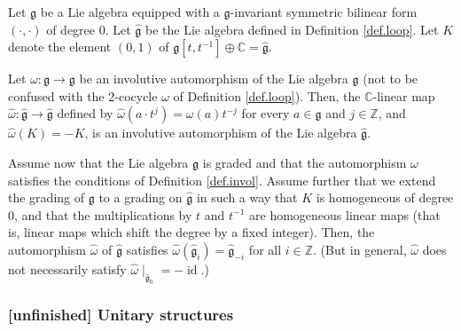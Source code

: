 \documentclass[etingof-lie.tex]{subfiles}
\begin{document}
\begin{proposition}
Let $\mathfrak{g}$ be a Lie algebra equipped with a $\mathfrak{g}$-invariant
symmetric bilinear form $\left(  \cdot,\cdot\right)  $ of degree $0$. Let
$\widehat{\mathfrak{g}}$ be the Lie algebra defined in Definition
\ref{def.loop}. Let $K$ denote the element $\left(  0,1\right)  $ of
$\mathfrak{g}\left[  t,t^{-1}\right]  \oplus\mathbb{C}=\widehat{\mathfrak{g}}$.

Let $\omega:\mathfrak{g}\rightarrow\mathfrak{g}$ be an involutive automorphism
of the Lie algebra $\mathfrak{g}$ (not to be confused with the $2$-cocycle
$\omega$ of Definition \ref{def.loop}). Then, the $\mathbb{C}$-linear map
$\widehat{\omega}:\widehat{\mathfrak{g}}\rightarrow\widehat{\mathfrak{g}}$
defined by $\widehat{\omega}\left(  a\cdot t^{j}\right)  =\omega\left(
a\right)  t^{-j}$ for every $a\in\mathfrak{g}$ and $j\in\mathbb{Z}$, and
$\widehat{\omega}\left(  K\right)  =-K$, is an involutive automorphism of the
Lie algebra $\widehat{\mathfrak{g}}$.

Assume now that the Lie algebra $\mathfrak{g}$ is graded and that the
automorphism $\omega$ satisfies the conditions of Definition \ref{def.invol}.
Assume further that we extend the grading of $\mathfrak{g}$ to a grading on
$\widehat{\mathfrak{g}}$ in such a way that $K$ is homogeneous of degree $0$,
and that the multiplications by $t$ and $t^{-1}$ are homogeneous linear maps
(that is, linear maps which shift the degree by a fixed integer). Then, the
automorphism $\widehat{\omega}$ of $\widehat{\mathfrak{g}}$ satisfies
$\widehat{\omega}\left(  \widehat{\mathfrak{g}}_{i}\right)
=\widehat{\mathfrak{g}}_{-i}$ for all $i\in\mathbb{Z}$. (But in general,
$\widehat{\omega}$ does not necessarily satisfy $\widehat{\omega}%
\mid_{\widehat{\mathfrak{g}}_{0}}=-\operatorname*{id}$.)
\end{proposition}

\subsubsection{\textbf{[unfinished]} Unitary structures}
\end{document}
